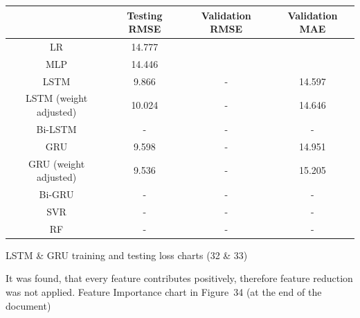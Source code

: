 \begin{center}
    \begin{tabular}{ |c|c|c|c| }
        \hline
        & Testing RMSE & Validation RMSE & Validation MAE \\
        \hline
        LR                     & 14.777       &                 &                \\
        \hline
        MLP                    & 14.446       &                 &                \\
        \hline
        LSTM                   & 9.866        & -               & 14.597         \\
        \hline
        LSTM (weight adjusted) & 10.024       & -               & 14.646         \\
        \hline
        Bi-LSTM                & -            & -               & -              \\
        \hline
        GRU                    & 9.598        & -               & 14.951         \\
        \hline
        GRU (weight adjusted)  & 9.536        & -               & 15.205         \\
        \hline
        Bi-GRU                 & -            & -               & -              \\
        \hline
        SVR                    & -            & -               & -              \\
        \hline
        RF                     & -            & -               & -              \\
        \hline
    \end{tabular}
\end{center}

LSTM \& GRU training and testing loss charts (32 \& 33) %

It was found, that every feature contributes positively, therefore feature reduction was not applied.
Feature Importance chart in Figure~34 (at the end of the document) %


